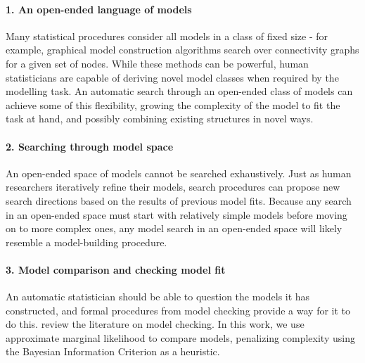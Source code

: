 \paragraph{1. An open-ended language of models}
Many statistical procedures consider all models in a class of fixed size - for example, graphical model construction algorithms search over connectivity graphs for a given set of nodes.
While these methods can be powerful, human statisticians are capable of deriving novel model classes when required by the modelling task.
An automatic search through an open-ended class of models can achieve some of this flexibility, growing the complexity of the model to fit the task at hand, and possibly combining existing structures in novel ways.

\paragraph{2. Searching through model space}
An open-ended space of models cannot be searched exhaustively.
Just as human researchers iteratively refine their models, search procedures can propose new search directions based on the results of previous model fits.
Because any search in an open-ended space must start with relatively simple models before moving on to more complex ones, any model search in an open-ended space will likely resemble a model-building procedure.%

\paragraph{3. Model comparison and checking model fit}
An automatic statistician should be able to question the models it has constructed, and formal procedures from model checking provide a way for it to do this.
\citet{gelman2012philosophy} review the literature on model checking.
In this work, we use approximate marginal likelihood to compare models, penalizing complexity using the Bayesian Information Criterion as a heuristic.

